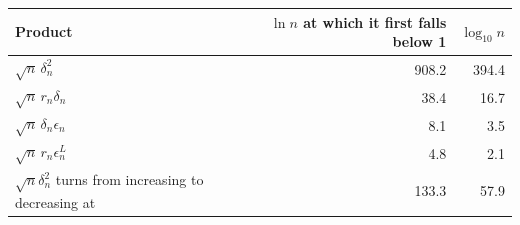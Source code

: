 \begin{tabular}{lrr}
\toprule
Product & $\ln n$ at which it first falls below 1 & $\log_{10} n$ \\
\midrule
$\sqrt n\,\delta_n^2$ & 908.2 & 394.4 \\
$\sqrt n\,r_n\delta_n$ & 38.4 & 16.7 \\
$\sqrt n\,\delta_n\epsilon_n$ & 8.1 & 3.5 \\
$\sqrt n\,r_n\epsilon^L_n$ & 4.8 & 2.1 \\
\midrule
$\sqrt n\delta_n^2$ turns from increasing to decreasing at & 133.3 & 57.9 \\
\bottomrule
\end{tabular}

